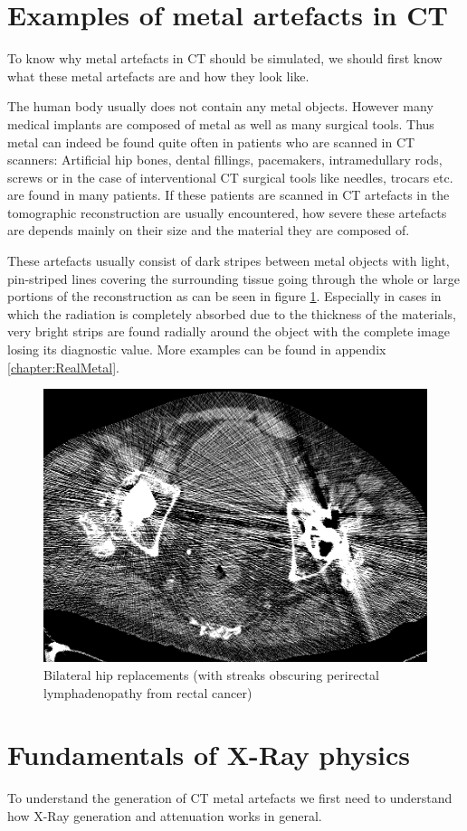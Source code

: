\section{Examples of metal artefacts in CT}
\par To know why metal artefacts in CT should be simulated, we should first know what these metal artefacts are and how they look like.
\par The human body usually does not contain any metal objects. However many medical implants are composed of metal as well as many surgical tools. Thus metal can indeed be found quite often in patients who are scanned in CT scanners: Artificial hip bones, dental fillings, pacemakers, intramedullary rods, screws or in the case of interventional CT surgical tools like needles, trocars etc. are found in many patients. If these patients are scanned in CT artefacts in the tomographic reconstruction are usually encountered, how severe these artefacts are depends mainly on their size and the material they are composed of.
\par These artefacts usually consist of dark stripes between metal objects with light, pin-striped lines covering the surrounding tissue going through the whole or large portions of the reconstruction as can be seen in figure \ref{BilateralHipReplacements}. Especially in cases in which the radiation is completely absorbed due to the thickness of the materials, very bright strips are found radially around the object with the complete image losing its diagnostic value. More examples can be found in appendix \ref{chapter:RealMetal}.
\begin{figure}[h]
	\centering
	\includegraphics[width=0.5\linewidth]{images/12_FBP.png}
	\caption{Bilateral hip replacements (with streaks obscuring perirectal lymphadenopathy from rectal cancer)\cite{revisionrads}}
	\label{BilateralHipReplacements}
\end{figure}
\section{Fundamentals of X-Ray physics}
\par To understand the generation of CT metal artefacts we first need to understand how X-Ray generation and attenuation works in general.
